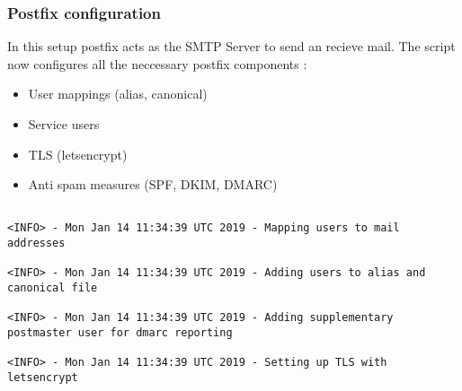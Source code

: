  \subsubsection{Postfix configuration}
 In this setup postfix acts as the \gls{SMTP} Server to send an recieve mail. The script now configures all the neccessary postfix components \cite{spf-dkim-postfix}:
 \begin{itemize}
 \item{User mappings (alias, canonical)}
 \item{Service users}
 \item{\gls{TLS} (letsencrypt)}
 \item{Anti spam measures (\gls{SPF}, \gls{DKIM}, \gls{DMARC})}
 \end{itemize} 
 \begin{lstlisting}[escapeinside=||]    

<INFO> - Mon Jan 14 11:34:39 UTC 2019 - Mapping users to mail addresses
                                                                                                                                                                                                                                                                                                                                              
<INFO> - Mon Jan 14 11:34:39 UTC 2019 - Adding users to alias and canonical file
                                                                                                                                                                                                                                                                                                                                              
<INFO> - Mon Jan 14 11:34:39 UTC 2019 - Adding supplementary postmaster user for dmarc reporting
                                                                                                                                                                                                                                                                                                                                              
<INFO> - Mon Jan 14 11:34:39 UTC 2019 - Setting up TLS with letsencrypt
                                                                                                                                                                                                                                                                                                                                              

\end{lstlisting}
